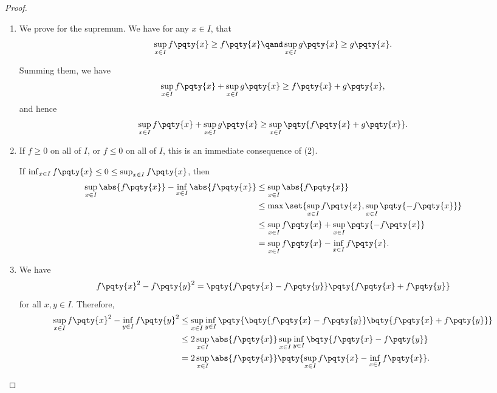 \begin{proof}
\begin{enumerate}
        On the other hand, we have
        \begin{align*}
            &\phantom{\implies} \forall x \in I: \sup_{x \in I} \pqty{f\pqty{x}} \geq f\pqty{x} \\
            &\implies \forall x \in I: \lambda \sup_{x \in I} \pqty{f\pqty{x}} \geq \lambda f\pqty{x} \\
            &\implies \lambda \sup_{x \in I} \pqty{f\pqty{x}} \geq \sup_{x \in I} \pqty{\lambda f\pqty{x}}.
        \end{align*}

        \item We prove for the supremum. We have for any \(x \in I\), that
        \[
            \sup_{x \in I} f\pqty{x} \geq f\pqty{x}
            \qand
            \sup_{x \in I} g\pqty{x} \geq g\pqty{x}.
        \]

        Summing them, we have
        \[
            \sup_{x \in I} f\pqty{x} + \sup_{x \in I} g\pqty{x} \geq f\pqty{x} + g\pqty{x},
        \]
        and hence
        \[
             \sup_{x \in I} f\pqty{x} + \sup_{x \in I} g\pqty{x} \geq \sup_{x \in I} \pqty{f\pqty{x} + g\pqty{x}}.
        \]

        \item If \(f \geq 0\) on all of \(I\), or \(f \leq 0\) on all of \(I\), this is an immediate consequence of (2).
        
        If \(\inf_{x \in I} f\pqty{x} \leq 0 \leq \sup_{x \in I} f\pqty{x}\), then
        \begin{align*}
            \sup_{x \in I} \abs{f\pqty{x}} - \inf_{x \in I} \abs{f\pqty{x}} &\leq \sup_{x \in I} \abs{f \pqty{x}} \\
            &\leq \max \set{\sup_{x \in I} f\pqty{x}, \sup_{x \in I} \pqty{-f\pqty{x}}} \\
            &\leq \sup_{x \in I} f\pqty{x} + \sup_{x \in I} \pqty{-f\pqty{x}} \\
            &= \sup_{x \in I} f\pqty{x} - \inf_{x \in I} f\pqty{x}.
        \end{align*}

        \item We have
        \[
            f\pqty{x}^2 - f\pqty{y}^2 = \pqty{f\pqty{x} - f\pqty{y}} \pqty{f\pqty{x} + f\pqty{y}}
        \]
        for all \(x, y \in I\). Therefore,
        \begin{align*}
            \sup_{x \in I} f\pqty{x}^2 - \inf_{y \in I} f\pqty{y}^2 &\leq \sup_{x \in I} \inf_{y \in I} \pqty{\bqty{f\pqty{x} - f\pqty{y}} \bqty{f\pqty{x} + f\pqty{y}}} \\
            &\leq 2 \sup_{x \in I} \abs{f\pqty{x}} \sup_{x \in I} \inf_{y \in I} \bqty{f\pqty{x} - f\pqty{y}} \\
            &= 2 \sup_{x \in I} \abs{f\pqty{x}} \pqty{\sup_{x \in I} f\pqty{x} - \inf_{x \in I} f\pqty{x}}.
        \end{align*}
    \end{enumerate}
\end{proof}

